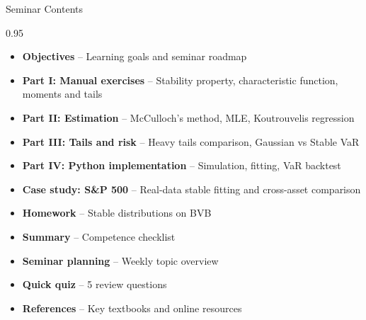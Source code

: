 \documentclass[9pt, aspectratio=169, t]{beamer}
\subtitle{Seminar 3: Stable Distributions}
\begin{document}
{
\begin{frame}
    \titlepage
\end{frame}
}

\begin{frame}{Seminar Contents}
    \begin{cminipage}{0.95\textwidth}
    \begin{itemize}\setlength{\itemsep}{0pt}
        \item \textbf{Objectives} -- Learning goals and seminar roadmap
        \vspace{0.15cm}
        \item \textbf{Part I: Manual exercises} -- Stability property, characteristic function, moments and tails
        \vspace{0.15cm}
        \item \textbf{Part II: Estimation} -- McCulloch's method, MLE, Koutrouvelis regression
        \vspace{0.15cm}
        \item \textbf{Part III: Tails and risk} -- Heavy tails comparison, Gaussian vs Stable VaR
        \vspace{0.15cm}
        \item \textbf{Part IV: Python implementation} -- Simulation, fitting, VaR backtest
        \vspace{0.15cm}
        \item \textbf{Case study: S\&P 500} -- Real-data stable fitting and cross-asset comparison
        \vspace{0.15cm}
        \item \textbf{Homework} -- Stable distributions on BVB
        \vspace{0.15cm}
        \item \textbf{Summary} -- Competence checklist
        \vspace{0.15cm}
        \item \textbf{Seminar planning} -- Weekly topic overview
        \vspace{0.15cm}
        \item \textbf{Quick quiz} -- 5 review questions
        \vspace{0.15cm}
        \item \textbf{References} -- Key textbooks and online resources
    \end{itemize}
    \end{cminipage}
\end{frame}
\end{document}
